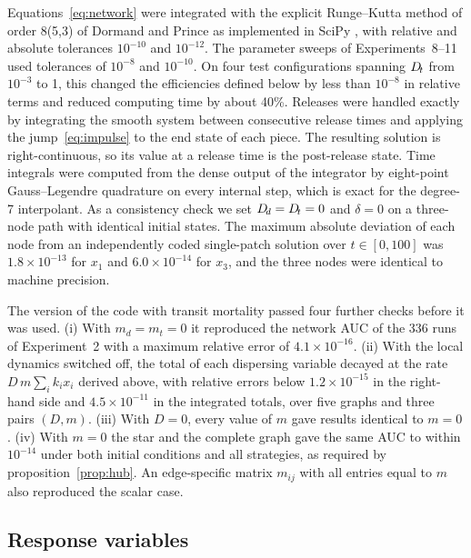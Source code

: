 Equations~\eqref{eq:network} were integrated with the explicit Runge--Kutta method of order 8(5,3) of Dormand and Prince as implemented in SciPy \citep{hairer1993,virtanen2020}, with relative and absolute tolerances $10^{-10}$ and $10^{-12}$. The parameter sweeps of Experiments~8--11 used tolerances of $10^{-8}$ and $10^{-10}$. On four test configurations spanning $D_{\!t}$ from $10^{-3}$ to 1, this changed the efficiencies defined below by less than $10^{-8}$ in relative terms and reduced computing time by about 40\%. Releases were handled exactly by integrating the smooth system between consecutive release times and applying the jump~\eqref{eq:impulse} to the end state of each piece. The resulting solution is right-continuous, so its value at a release time is the post-release state. Time integrals were computed from the dense output of the integrator by eight-point Gauss--Legendre quadrature on every internal step, which is exact for the degree-7 interpolant. As a consistency check we set $D_{\!d} = D_{\!t} = 0$ and $\delta = 0$ on a three-node path with identical initial states. The maximum absolute deviation of each node from an independently coded single-patch solution over $t\in[0,100]$ was $1.8\times10^{-13}$ for $x_1$ and $6.0\times10^{-14}$ for $x_3$, and the three nodes were identical to machine precision.

The version of the code with transit mortality passed four further checks before it was used. (i) With $m_d = m_t = 0$ it reproduced the network AUC of the 336 runs of Experiment~2 with a maximum relative error of $4.1\times10^{-16}$. (ii) With the local dynamics switched off, the total of each dispersing variable decayed at the rate $D\,m\sum_i k_i x_i$ derived above, with relative errors below $1.2\times10^{-15}$ in the right-hand side and $4.5\times10^{-11}$ in the integrated totals, over five graphs and three pairs $(D, m)$. (iii) With $D = 0$, every value of $m$ gave results identical to $m = 0$. (iv) With $m = 0$ the star and the complete graph gave the same AUC to within $10^{-14}$ under both initial conditions and all strategies, as required by proposition~\ref{prop:hub}. An edge-specific matrix $m_{ij}$ with all entries equal to $m$ also reproduced the scalar case.

\subsection{Response variables}
\label{sec:metrics}

